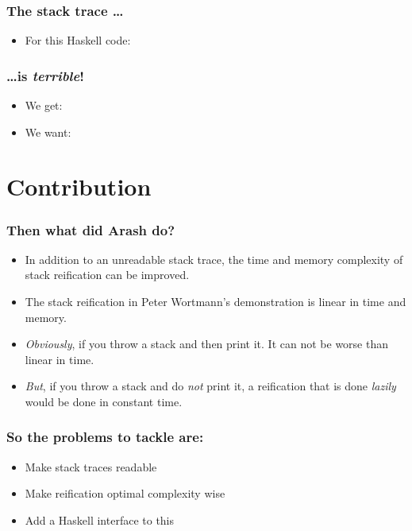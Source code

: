 \documentclass[11pt]{beamer} %
\begin{document}
  \begin{frame}
   \frametitle{The stack trace \dots}
  \begin{itemize}
   \item For this Haskell code:
     \HaskellSTCode
  \end{itemize}
  \end{frame}

  \begin{frame}
   \frametitle{\dots is \emph{terrible}!}
  \begin{itemize}
   \item <1-> We get:
     \OriginalTraceCode
   \item <2-> We want:
     \IdealTraceCode
  \end{itemize}
  \end{frame}

\section{Contribution}

  \begin{frame}
   \frametitle{Then what did Arash do?}
  \begin{itemize}
   \item <1-> In addition to an unreadable stack trace, the time and memory
     complexity of stack reification can be improved.
   \item <2-> The stack reification in Peter Wortmann's demonstration is linear
     in time and memory.
   \item <3-> \emph{Obviously}, if you throw a stack and then print it. It can
     not be worse than linear in time.
   \item <4-> \emph{But}, if you throw a stack and do \emph{not} print it, a
     reification that is done \emph{lazily} would be done in constant time.
  \end{itemize}
  \end{frame}

  \begin{frame}
   \frametitle{So the problems to tackle are:}
  \begin{itemize}
   \item <1-> Make stack traces readable
   \item <2-> Make reification optimal complexity wise
   \item <3-> Add a Haskell interface to this
  \end{itemize}
  \end{frame}
\end{document}
